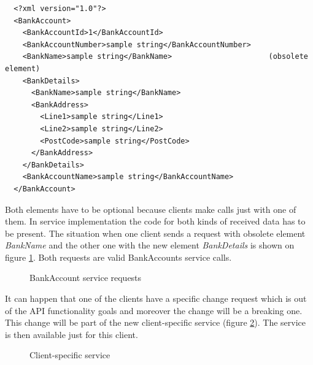 \begin{lstlisting}
  <?xml version="1.0"?>
  <BankAccount>
    <BankAccountId>1</BankAccountId>
    <BankAccountNumber>sample string</BankAccountNumber>
    <BankName>sample string</BankName>                      (obsolete element)
    <BankDetails>
      <BankName>sample string</BankName>
      <BankAddress>
        <Line1>sample string</Line1>
        <Line2>sample string</Line2>
        <PostCode>sample string</PostCode>
      </BankAddress>
    </BankDetails>
    <BankAccountName>sample string</BankAccountName>
  </BankAccount>
\end{lstlisting}

Both elements have to be optional because clients make calls just with one of them. In service implementation the code for both kinds of received data has to be present. The situation when one client sends a request with obsolete element \emph{BankName} and the other one with the new element \emph{BankDetails} is shown on figure \ref{fig:compatible-api-change}. Both requests are valid BankAccounts service calls.

\begin{figure}[htp] 
\caption{BankAccount service requests}
\label{fig:compatible-api-change}
\end{figure} 

It can happen that one of the clients have a specific change request which is out of the API functionality goals and moreover the change will be a breaking one. This change will be part of the new client-specific service (figure \ref{fig:custom-service}). The service is then available just for this client. 

\begin{figure}[htp] 
\caption{Client-specific service}
\label{fig:custom-service}
\end{figure} 


